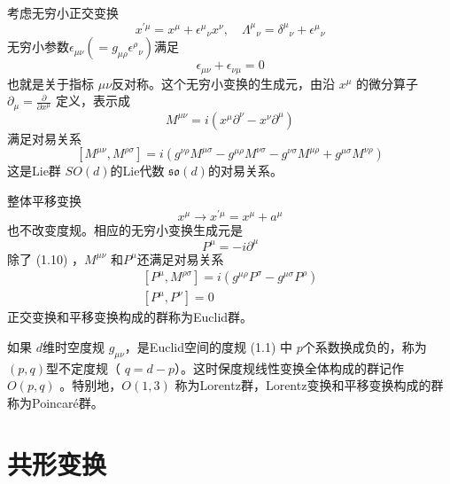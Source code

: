 考虑无穷小正交变换
\begin{equation}
x^{\prime \mu}=x^{\mu}+\epsilon^{\mu}{}_{\nu} x^{\nu}, \quad \Lambda^{\mu}{}_{\nu}=\delta^{\mu}{}_{\nu}+\epsilon^{\mu}{}_{\nu}
\end{equation}
无穷小参数$ \epsilon_{\mu \nu}\left(=g_{\mu \rho} \epsilon^{\rho}{}_{\nu}\right) $满足
\begin{equation}
		\epsilon_{\mu \nu}+\epsilon_{\nu \mu}=0
\end{equation}
也就是关于指标 $\mu\nu $反对称。这个无穷小变换的生成元，由沿 $x^\mu$ 的微分算子 $\partial_{\mu}=\frac{\partial}{\partial x^{\mu}}$ 定义，表示成
\begin{equation}
		M^{\mu \nu}=i\left(x^{\mu} \partial^{\nu}-x^{\nu} \partial^{\mu}\right)
\end{equation}
满足对易关系
\begin{equation}
		\left[M^{\mu \nu}, M^{\rho \sigma}\right]=i\left(g^{\nu \rho} M^{\mu \sigma}-g^{\mu \rho} M^{\nu \sigma}-g^{\nu \sigma} M^{\mu \rho}+g^{\mu \sigma} M^{\nu \rho}\right)
\end{equation}
这是Lie群 $SO(d) $的Lie代数 $\mathfrak{so}(d) $的对易关系。

整体平移变换
\begin{equation}
	x^{\mu} \rightarrow x^{\prime \mu}=x^{\mu}+a^{\mu}
\end{equation}
也不改变度规。相应的无穷小变换生成元是
\begin{equation}
	P^{\mu}=-i \partial^{\mu}
\end{equation}
除了 (1.10) ，$M^{\mu\nu}$ 和$ P^\mu $还满足对易关系
\begin{equation}
	\begin{array}{l} {\left[P^{\mu}, M^{\rho \sigma}\right]=i\left(g^{\mu \rho} P^{\sigma}-g^{\mu \sigma} P^{\rho}\right)} \\ {\left[P^{\mu}, P^{\nu}\right]=0} \end{array}
\end{equation}
正交变换和平移变换构成的群称为Euclid群。

如果 $d $维时空度规 $g_{\mu\nu} $，是Euclid空间的度规 (1.1) 中 $p $个系数换成负的，称为 $(p,q) $型不定度规（ $q=d-p $）。这时保度规线性变换全体构成的群记作 $O(p,q)$ 。特别地，$ O(1,3)$ 称为Lorentz群，Lorentz变换和平移变换构成的群称为Poincaré群。

\section{共形变换}

